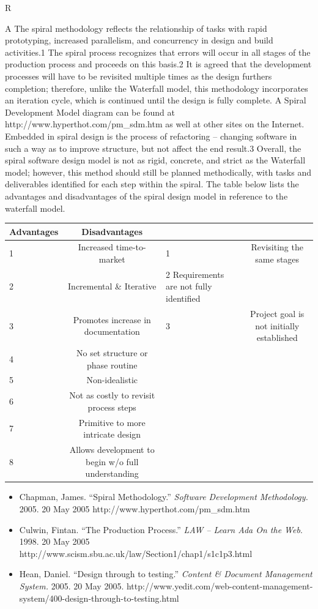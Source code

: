 \begin{enumerate}
\begin{ShowSolution}{R}
\begin{solution}{A}
The spiral methodology reflects the relationship of tasks with rapid
prototyping, increased parallelism, and concurrency in design and build
activities.1 The spiral process recognizes that errors will occur in all
stages of the production process and proceeds on this basis.2 It is
agreed that the development processes will have to be revisited multiple
times as the design furthers completion; therefore, unlike the Waterfall
model, this methodology incorporates an iteration cycle, which is
continued until the design is fully complete. A Spiral Development Model
diagram can be found at http://www.hyperthot.com/pm\_sdm.htm as
well at other sites on the Internet.
Embedded in spiral design is the process of refactoring -- changing
software in such a way as to improve structure, but not affect the end
result.3 Overall, the spiral software design model is not as rigid,
concrete, and strict as the Waterfall model; however, this method should
still be planned methodically, with tasks and deliverables identified
for each step within the spiral. The table below lists the advantages
and disadvantages of the spiral design model in reference to the
waterfall model.
\begin{tabular}{lc lc}\\ 
Advantages & Disadvantages \\ \hline
1 & Increased time-to-market & 1 & Revisiting the same stages  \\
2 & Incremental \& Iterative & 2 Requirements are not fully identified  \\
3 & Promotes increase in documentation & 3 & Project goal is not initially established  \\
4 & No set structure or phase routine & &   \\
5 & Non-idealistic &&   \\
6 & Not as costly to revisit process steps & &   \\
7 & Primitive to more intricate design & &  \\
8 & Allows development to begin w/o full understanding & &   \\
\end{tabular}
\begin{itemize}
\item Chapman, James. ``Spiral Methodology.'' \emph{Software Development
Methodology.} 2005. 20 May 2005 http://www.hyperthot.com/pm\_sdm.htm 
\item Culwin, Fintan. ``The Production Process.'' \emph{LAW -- Learn Ada On
the Web}. 1998. 20 May 2005 
http://www.scism.sbu.ac.uk/law/Section1/chap1/s1c1p3.html
\item Hean, Daniel. ``Design through to testing.'' \emph{Content \& Document
Management System.} 2005. 20 May 2005.
http://www.yedit.com/web-content-management-system/400-design-through-to-testing.html
\end{itemize}
 

\end{solution}
\end{ShowSolution}
\end{enumerate}
